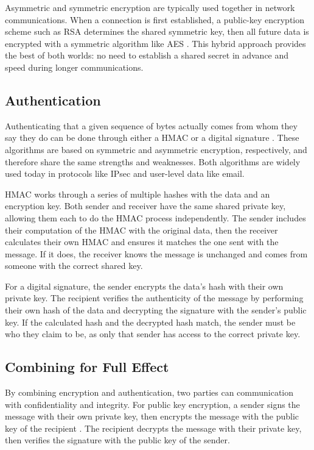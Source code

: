 \par Asymmetric and symmetric encryption are typically used together in network communications. When a connection is first established, a public-key encryption scheme such as \ac{RSA} determines the shared symmetric key, then all future data is encrypted with a symmetric algorithm like \ac{AES} \cite{HybridEncryption}. This hybrid approach provides the best of both worlds: no need to establish a shared secret in advance and speed during longer communications.

\subsection{Authentication}
\label{sec:authentication}
\par Authenticating that a given sequence of bytes actually comes from whom they say they do can be done through either a \ac{HMAC} \cite{rfc2104} or a digital signature \cite{rfc3447}. These algorithms are based on symmetric and asymmetric encryption, respectively, and therefore share the same strengths and weaknesses. Both algorithms are widely used today in protocols like \ac{IPsec} \cite{rfc2404} and user-level data like email.

\par \ac{HMAC} works through a series of multiple hashes with the data and an encryption key. Both sender and receiver have the same shared private key, allowing them each to do the \ac{HMAC} process independently. The sender includes their computation of the \ac{HMAC} with the original data, then the receiver calculates their own HMAC and ensures it matches the one sent with the message. If it does, the receiver knows the message is unchanged and comes from someone with the correct shared key.

\par For a digital signature, the sender encrypts the data's hash with their own private key. The recipient verifies the authenticity of the message by performing their own hash of the data and decrypting the signature with the sender's public key. If the calculated hash and the decrypted hash match, the sender must be who they claim to be, as only that sender has access to the correct private key.

\subsection{Combining for Full Effect}
\label{sec:auth_and_encrypt}
\par By combining encryption and authentication, two parties can communication with confidentiality and integrity. For public key encryption, a sender signs the message with their own private key, then encrypts the message with the public key of the recipient \cite{An01authenticatedencryption}. The recipient decrypts the message with their private key, then verifies the signature with the public key of the sender.


